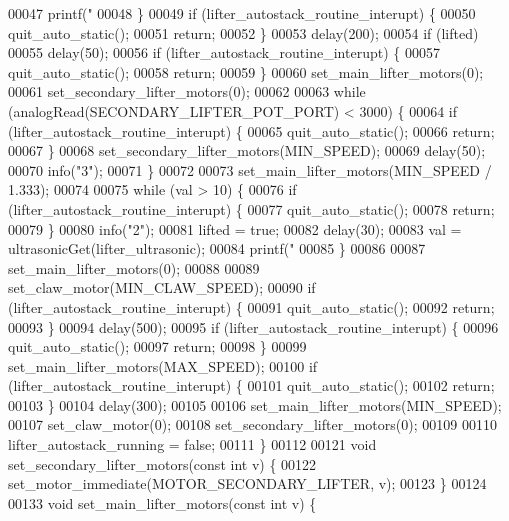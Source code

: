 \begin{DoxyCode}
{00047     printf(\textcolor{stringliteral}{"%
00048   \}
00049   \textcolor{keywordflow}{if} (lifter_autostack_routine_interupt) \{
00050     quit_auto_static();
00051     \textcolor{keywordflow}{return};
00052   \}
00053   delay(200);
00054   \textcolor{keywordflow}{if} (lifted)
00055     delay(50);
00056   \textcolor{keywordflow}{if} (lifter_autostack_routine_interupt) \{
00057     quit_auto_static();
00058     \textcolor{keywordflow}{return};
00059   \}
00060   set_main_lifter_motors(0);
00061   set_secondary_lifter_motors(0);
00062 
00063   \textcolor{keywordflow}{while} (analogRead(SECONDARY\_LIFTER\_POT\_PORT) < 3000) \{
00064     \textcolor{keywordflow}{if} (lifter_autostack_routine_interupt) \{
00065       quit_auto_static();
00066       \textcolor{keywordflow}{return};
00067     \}
00068     set_secondary_lifter_motors(MIN\_SPEED);
00069     delay(50);
00070     info(\textcolor{stringliteral}{"3"});
00071   \}
00072 
00073   set_main_lifter_motors(MIN\_SPEED / 1.333);
00074 
00075   \textcolor{keywordflow}{while} (val > 10) \{
00076     \textcolor{keywordflow}{if} (lifter_autostack_routine_interupt) \{
00077       quit_auto_static();
00078       \textcolor{keywordflow}{return};
00079     \}
00080     info(\textcolor{stringliteral}{"2"});
00081     lifted = \textcolor{keyword}{true};
00082     delay(30);
00083     val = ultrasonicGet(lifter_ultrasonic);
00084     printf(\textcolor{stringliteral}{"%
00085   \}
00086 
00087   set_main_lifter_motors(0);
00088 
00089   set_claw_motor(MIN\_CLAW\_SPEED);
00090   \textcolor{keywordflow}{if} (lifter_autostack_routine_interupt) \{
00091     quit_auto_static();
00092     \textcolor{keywordflow}{return};
00093   \}
00094   delay(500);
00095   \textcolor{keywordflow}{if} (lifter_autostack_routine_interupt) \{
00096     quit_auto_static();
00097     \textcolor{keywordflow}{return};
00098   \}
00099   set_main_lifter_motors(MAX\_SPEED);
00100   \textcolor{keywordflow}{if} (lifter_autostack_routine_interupt) \{
00101     quit_auto_static();
00102     \textcolor{keywordflow}{return};
00103   \}
00104   delay(300);
00105 
00106   set_main_lifter_motors(MIN\_SPEED);
00107   set_claw_motor(0);
00108   set_secondary_lifter_motors(0);
00109 
00110   lifter_autostack_running = \textcolor{keyword}{false};
00111 \}
00112 
00121 \textcolor{keywordtype}{void} set_secondary_lifter_motors(\textcolor{keyword}{const} \textcolor{keywordtype}{int} v) \{
00122   set_motor_immediate(MOTOR\_SECONDARY\_LIFTER, v);
00123 \}
00124 
00133 \textcolor{keywordtype}{void} set_main_lifter_motors(\textcolor{keyword}{const} \textcolor{keywordtype}{int} v) \{
}}}
\end{DoxyCode}
